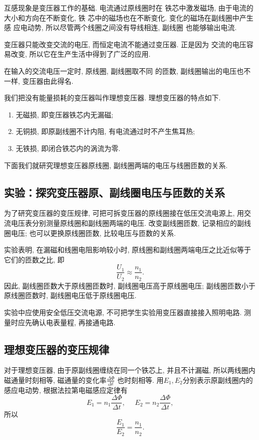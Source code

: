 \documentclass[11pt,a4paper]{ctexbook}
\newcommand{\bre}{\ \ \ }
\begin{document}
互感现象是变压器工作的基础. 电流通过原线圈时在
铁芯中激发磁场, 由于电流的大小和方向在不断变化, 铁
芯中的磁场也在不断变化. 变化的磁场在副线圈中产生感
应电动势, 所以尽管两个线圈之间没有导线相连, 副线圈
也能够输出电流.

变压器只能改变交流的电压, 而恒定电流不能通过变压器. 正是因为
交流的电压容易改变, 所以它在生产生活中得到了广泛的应用.

在输入的交流电压一定时, 原线圈, 副线圈取不同
的匝数, 副线圈输出的电压也不一样, 变压器由此得名.

我们把没有能量损耗的变压器叫作理想变压器. 理想变压器的特点如下.
\begin{enumerate}
    \item 无磁损, 即变压器铁芯内无漏磁;
    \item 无铜损, 即原副线圈不计内阻, 有电流通过时不产生焦耳热;
    \item 无铁损, 即闭合铁芯内的涡流为零.
\end{enumerate}

下面我们就研究理想变压器原线圈, 副线圈两端的电压与线圈匝数的关系.



\subsection{实验：探究变压器原、副线圈电压与匝数的关系}

为了研究变压器的变压规律, 可把可拆变压器的原线圈接在低压交流电源上, 用交流电压表分别测量原线圈和副线圈两端的电压. 改变副线圈匝数, 记录相应的副线圈电压; 也可以更换原线圈匝数, 比较电压与匝数的关系.

实验表明, 在漏磁和线圈电阻影响较小时, 原线圈和副线圈两端电压之比近似等于它们的匝数之比, 即
$$\frac{U_1}{U_2}\approx \frac{n_1}{n_2}.$$
因此, 副线圈匝数大于原线圈匝数时, 副线圈电压高于原线圈电压; 副线圈匝数小于原线圈匝数时, 副线圈电压低于原线圈电压.

实验中应使用安全低压交流电源, 不可把学生实验用变压器直接接入照明电路. 测量时应先确认电表量程, 再接通电路.

\subsection{理想变压器的变压规律}

对于理想变压器, 由于原副线圈缠绕在同一个铁芯上, 并且不计漏磁, 所以两线圈内磁通量时刻相等,
磁通量的变化率$\displaystyle\frac{\Delta\Phi}{\Delta t}$
也时刻相等. 用$E_1, E_2$分别表示原副线圈内的感应电动势,
根据法拉第电磁感应定律有
$$E_1 = n_1\frac{\Delta\Phi}{\Delta t}, \bre \bre E_2 = n_2\frac{\Delta\Phi}{\Delta t}, $$
所以$$\frac{E_1}{E_2} = \frac{n_1}{n_2}.$$
\end{document}
